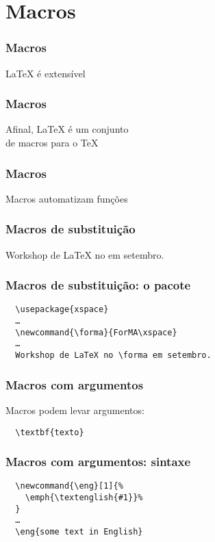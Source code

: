 \section{Macros}

\begin{frame}
  \frametitle{Macros}
  \LARGE
  \LaTeX{} é extensível
\end{frame}

\begin{frame}
  \frametitle{Macros}
  \LARGE
  Afinal, \LaTeX{} é um conjunto\\ de macros para o \TeX
\end{frame}

\begin{frame}
  \frametitle{Macros}
  \LARGE
  Macros automatizam funções
\end{frame}

\begin{frame}[fragile]
  \frametitle{Macros de substituição}
  \LARGE
  \latexcode{\newcommand{\forma}{ForMA}}
  \vspace{1em}

  Workshop de LaTeX no \latexcode{\forma{}} em setembro.
\end{frame}

\begin{frame}[fragile]
  \frametitle{Macros de substituição: o pacote }
  \begin{verbatim}
  \usepackage{xspace}
  …
  \newcommand{\forma}{ForMA\xspace}
  …
  Workshop de LaTeX no \forma em setembro.
  \end{verbatim}
\end{frame}

\begin{frame}[fragile]
  \frametitle{Macros com argumentos}
  \LARGE
  Macros podem levar argumentos:

  \begin{verbatim}
  \textbf{texto}
  \end{verbatim}
\end{frame}

\begin{frame}[fragile]
  \frametitle{Macros com argumentos: sintaxe}
  \begin{verbatim}
  \newcommand{\eng}[1]{%
    \emph{\textenglish{#1}}%
  }
  …
  \eng{some text in English}
  \end{verbatim}
\end{frame}

